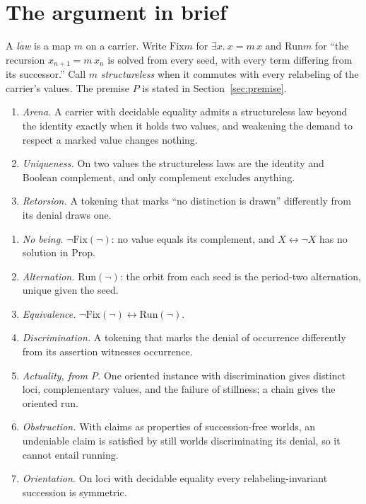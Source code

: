 \documentclass[11pt]{article}
\newcommand{\Fix}{\mathrm{Fix}}
\newcommand{\Run}{\mathrm{Run}}
\begin{document}
\section{The argument in brief}
\label{sec:brief}

A \emph{law} is a map $m$ on a carrier. Write $\Fix m$ for $\exists x.\ x = m\,x$ and $\Run m$ for ``the recursion $x_{n+1} = m\,x_n$ is solved from every seed, with every term differing from its successor.'' Call $m$ \emph{structureless} when it commutes with every relabeling of the carrier's values. The premise $P$ is stated in Section~\ref{sec:premise}.

\begin{enumerate}[label=\textbf{L\arabic*.},itemsep=1pt,leftmargin=*]
\item \emph{Arena.} A carrier with decidable equality admits a structureless law beyond the identity exactly when it holds two values, and weakening the demand to respect a marked value changes nothing.
\item \emph{Uniqueness.} On two values the structureless laws are the identity and Boolean complement, and only complement excludes anything.
\item \emph{Retorsion.} A tokening that marks ``no distinction is drawn'' differently from its denial draws one.
\end{enumerate}

\begin{enumerate}[label=\textbf{T\arabic*.},itemsep=1pt,leftmargin=*]
\item \emph{No being.} $\lnot\Fix(\lnot)$: no value equals its complement, and $X \leftrightarrow \lnot X$ has no solution in $\mathrm{Prop}$.
\item \emph{Alternation.} $\Run(\lnot)$: the orbit from each seed is the period-two alternation, unique given the seed.
\item \emph{Equivalence.} $\lnot\Fix(\lnot) \leftrightarrow \Run(\lnot)$.
\item \emph{Discrimination.} A tokening that marks the denial of occurrence differently from its assertion witnesses occurrence.
\item \emph{Actuality, from $P$.} One oriented instance with discrimination gives distinct loci, complementary values, and the failure of stillness; a chain gives the oriented run.
\item \emph{Obstruction.} With claims as properties of succession-free worlds, an undeniable claim is satisfied by still worlds discriminating its denial, so it cannot entail running.
\item \emph{Orientation.} On loci with decidable equality every relabeling-invariant succession is symmetric.
\end{enumerate}
\end{document}

